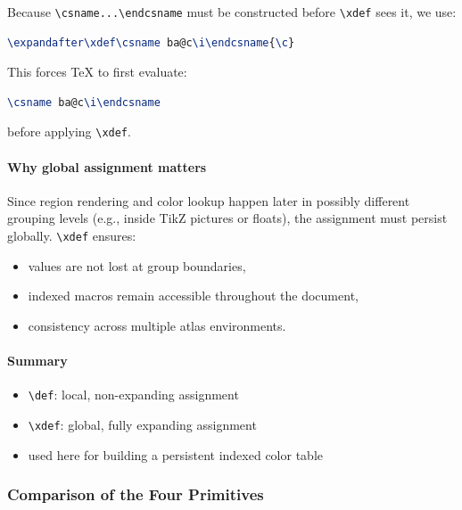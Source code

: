 Because \verb|\csname...\endcsname| must be constructed before \verb|\xdef| sees it, we use:

\begin{lstlisting}[language=LaTeX]
\expandafter\xdef\csname ba@c\i\endcsname{\c}
\end{lstlisting}

This forces TeX to first evaluate:

\begin{lstlisting}[language=LaTeX]
\csname ba@c\i\endcsname
\end{lstlisting}

before applying \verb|\xdef|.



\paragraph{Why global assignment matters}

Since region rendering and color lookup happen later in possibly different grouping levels (e.g., inside TikZ pictures or floats), the assignment must persist globally. \verb|\xdef| ensures:

\begin{itemize}
\item values are not lost at group boundaries,
\item indexed macros remain accessible throughout the document,
\item consistency across multiple atlas environments.
\end{itemize}



\paragraph{Summary}

\begin{itemize}
\item \verb|\def|: local, non-expanding assignment
\item \verb|\xdef|: global, fully expanding assignment
\item used here for building a persistent indexed color table
\end{itemize}

\subsubsection{Comparison of the Four Primitives}

